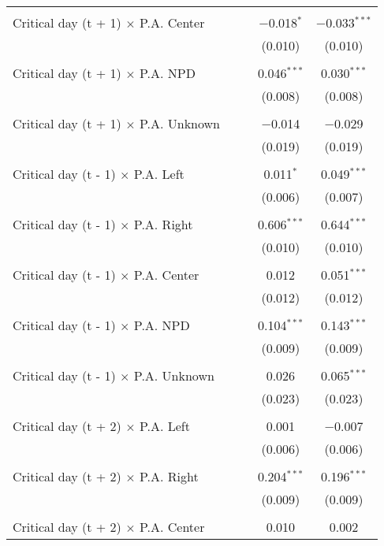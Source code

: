 \documentclass[
]{article}
\begin{document}
\begin{table}[!htbp]
{\begin{tabular}{@{\extracolsep{5pt}}lcccc}
  & & & & \\ 
 Critical day (t + 1) $\times$ P.A. Center &  &  & $-$0.018$^{*}$ & $-$0.033$^{***}$ \\ 
  &  &  & (0.010) & (0.010) \\ 
  & & & & \\ 
 Critical day (t + 1) $\times$ P.A. NPD &  &  & 0.046$^{***}$ & 0.030$^{***}$ \\ 
  &  &  & (0.008) & (0.008) \\ 
  & & & & \\ 
 Critical day (t + 1) $\times$ P.A. Unknown &  &  & $-$0.014 & $-$0.029 \\ 
  &  &  & (0.019) & (0.019) \\ 
  & & & & \\ 
 Critical day (t - 1) $\times$ P.A. Left &  &  & 0.011$^{*}$ & 0.049$^{***}$ \\ 
  &  &  & (0.006) & (0.007) \\ 
  & & & & \\ 
 Critical day (t - 1) $\times$ P.A. Right &  &  & 0.606$^{***}$ & 0.644$^{***}$ \\ 
  &  &  & (0.010) & (0.010) \\ 
  & & & & \\ 
 Critical day (t - 1) $\times$ P.A. Center &  &  & 0.012 & 0.051$^{***}$ \\ 
  &  &  & (0.012) & (0.012) \\ 
  & & & & \\ 
 Critical day (t - 1) $\times$ P.A. NPD &  &  & 0.104$^{***}$ & 0.143$^{***}$ \\ 
  &  &  & (0.009) & (0.009) \\ 
  & & & & \\ 
 Critical day (t - 1) $\times$ P.A. Unknown &  &  & 0.026 & 0.065$^{***}$ \\ 
  &  &  & (0.023) & (0.023) \\ 
  & & & & \\ 
 Critical day (t + 2) $\times$ P.A. Left &  &  & 0.001 & $-$0.007 \\ 
  &  &  & (0.006) & (0.006) \\ 
  & & & & \\ 
 Critical day (t + 2) $\times$ P.A. Right &  &  & 0.204$^{***}$ & 0.196$^{***}$ \\ 
  &  &  & (0.009) & (0.009) \\ 
  & & & & \\ 
 Critical day (t + 2) $\times$ P.A. Center &  &  & 0.010 & 0.002 \\ 

\end{tabular}}
\end{table}
\end{document}
